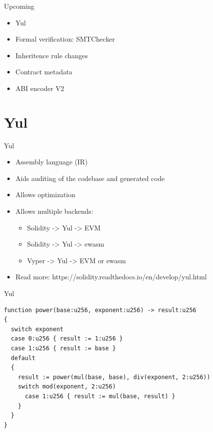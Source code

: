 \documentclass[aspectratio=169,10pt]{beamer}
\begin{document}
\begin{frame}{Upcoming}
  \begin{itemize}
    \item Yul
    \item Formal verification: SMTChecker
    \item Inheritence rule changes
    \item Contract metadata
    \item ABI encoder V2
	\end{itemize}
\end{frame}

\section{Yul}

\begin{frame}{Yul}
  \begin{itemize}
    \item Assembly language (IR)
    \item Aids auditing of the codebase and generated code
    \item Allows optimization
    \item Allows multiple backends:
    \begin{itemize}
      \item Solidity -> Yul -> EVM
      \item Solidity -> Yul -> ewasm
      \item Vyper -> Yul -> EVM or ewasm
    \end{itemize}
    \item Read more: https://solidity.readthedocs.io/en/develop/yul.html
	\end{itemize}
\end{frame}

\begin{frame}[fragile]{Yul}
  \begin{mdframed}
  \begin{lstlisting}[language=Yul]
function power(base:u256, exponent:u256) -> result:u256
{
  switch exponent
  case 0:u256 { result := 1:u256 }
  case 1:u256 { result := base }
  default
  {
    result := power(mul(base, base), div(exponent, 2:u256))
    switch mod(exponent, 2:u256)
      case 1:u256 { result := mul(base, result) }
    }
  }
}
  \end{lstlisting}
  \end{mdframed}
\end{frame}
\end{document}
